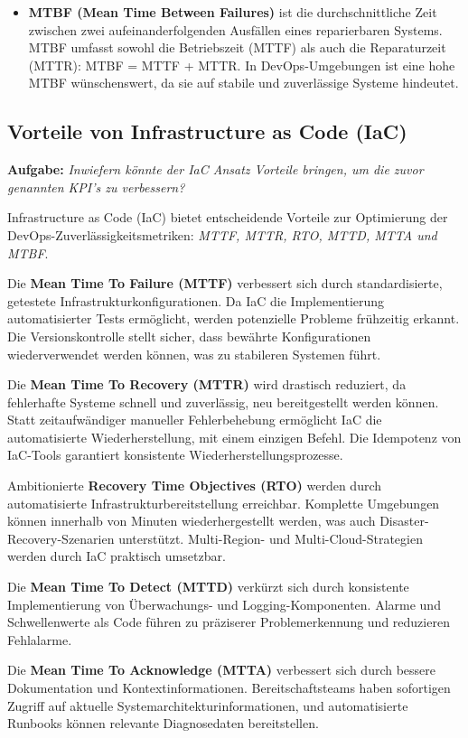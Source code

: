 \begin{itemize}
    \item \textbf{MTBF (Mean Time Between Failures)} ist die durchschnittliche Zeit zwischen zwei
    aufeinanderfolgenden Ausfällen eines reparierbaren Systems. MTBF umfasst sowohl die Betriebszeit
    (MTTF) als auch die Reparaturzeit (MTTR): MTBF = MTTF + MTTR. In DevOps-Umgebungen ist eine hohe
    MTBF wünschenswert, da sie auf stabile und zuverlässige Systeme hindeutet.
\end{itemize}
\cite{echolon_mttr,alertops_metrics}

\subsection{Vorteile von Infrastructure as Code (IaC)}
\textbf{Aufgabe:} \textit{Inwiefern könnte der IaC Ansatz Vorteile bringen, um die zuvor genannten
KPI's zu verbessern?}

Infrastructure as Code (IaC) bietet entscheidende Vorteile zur Optimierung der
DevOps-Zuverlässigkeitsmetriken: \textit{MTTF, MTTR, RTO, MTTD, MTTA und MTBF}.

Die \textbf{Mean Time To Failure (MTTF) }verbessert sich durch standardisierte, getestete
Infrastrukturkonfigurationen. Da IaC die Implementierung automatisierter Tests ermöglicht, werden
potenzielle Probleme frühzeitig erkannt. Die Versionskontrolle stellt sicher, dass bewährte
Konfigurationen wiederverwendet werden können, was zu stabileren Systemen führt.

Die \textbf{Mean Time To Recovery (MTTR)} wird drastisch reduziert, da fehlerhafte Systeme schnell
und zuverlässig, neu bereitgestellt werden können. Statt zeitaufwändiger manueller Fehlerbehebung
ermöglicht IaC die automatisierte Wiederherstellung, mit einem einzigen Befehl. Die Idempotenz von
IaC-Tools garantiert konsistente Wiederherstellungsprozesse.

Ambitionierte \textbf{Recovery Time Objectives (RTO)} werden durch automatisierte
Infrastrukturbereitstellung erreichbar. Komplette Umgebungen können innerhalb von Minuten
wiederhergestellt werden, was auch Disaster-Recovery-Szenarien unterstützt. Multi-Region- und
Multi-Cloud-Strategien werden durch IaC praktisch umsetzbar.

Die \textbf{Mean Time To Detect (MTTD)} verkürzt sich durch konsistente Implementierung von
Überwachungs- und Logging-Komponenten. Alarme und Schwellenwerte als Code führen zu präziserer
Problemerkennung und reduzieren Fehlalarme.

Die \textbf{Mean Time To Acknowledge (MTTA)} verbessert sich durch bessere Dokumentation und
Kontextinformationen. Bereitschaftsteams haben sofortigen Zugriff auf aktuelle
Systemarchitekturinformationen, und automatisierte Runbooks können relevante Diagnosedaten
bereitstellen.

